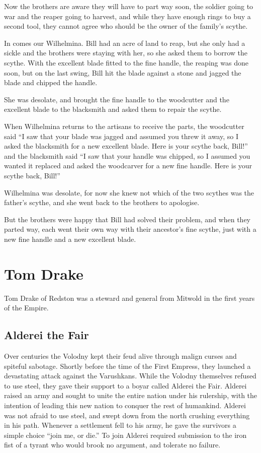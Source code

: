 Now the brothers are aware they will have to part way soon, the soldier going to war and the reaper going to harvest, and while they have enough rings to buy a second tool, they cannot agree who should be the owner of the family's scythe.

In comes our Wilhelmina. Bill had an acre of land to reap, but she only had a sickle and the brothers were staying with her, so she asked them to borrow the scythe. With the excellent blade fitted to the fine handle, the reaping was done soon, but on the last swing, Bill hit the blade against a stone and jagged the blade and chipped the handle.

She was desolate, and brought the fine handle to the woodcutter and the excellent blade to the blacksmith and asked them to repair the scythe.

When Wilhelmina returns to the artisans to receive the parts, the woodcutter said “I saw that your blade was jagged and assumed you threw it away, so I asked the blacksmith for a new excellent blade. Here is your scythe back, Bill!” and the blacksmith said “I saw that your handle was chipped, so I assumed you wanted it replaced and asked the woodcarver for a new fine handle. Here is your scythe back, Bill!”

Wilhelmina was desolate, for now she knew not which of the two scythes was the father’s scythe, and she went back to the brothers to apologise.

But the brothers were happy that Bill had solved their problem, and when they parted way, each went their own way with their ancestor's fine scythe, just with a new fine handle and a new excellent blade.
\section{Tom Drake}
Tom Drake of Redston was a steward and general from Mitwold in the first years of the Empire.
\subsection{Alderei the Fair}
Over centuries the Volodny kept their feud alive through malign curses and spiteful sabotage. Shortly before the time of the First Empress, they launched a devastating attack against the Varushkans. While the Volodny themselves refused to use steel, they gave their support to a boyar called Alderei the Fair. Alderei raised an army and sought to unite the entire nation under his rulership, with the intention of leading this new nation to conquer the rest of humankind. Alderei was not afraid to use steel, and swept down from the north crushing everything in his path. Whenever a settlement fell to his army, he gave the survivors a simple choice “join me, or die.” To join Alderei required submission to the iron fist of a tyrant who would brook no argument, and tolerate no failure.

